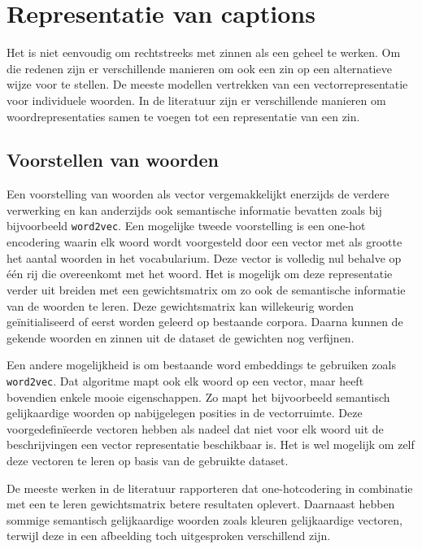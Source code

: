 \section{Representatie van captions}
Het is niet eenvoudig om rechtstreeks met zinnen als een geheel te werken. Om die redenen zijn er verschillende manieren om ook een zin op een alternatieve wijze voor te stellen.
De meeste modellen vertrekken van een vectorrepresentatie voor individuele woorden. In de literatuur zijn er verschillende manieren om woordrepresentaties samen te voegen tot een representatie van een zin.

\subsection{Voorstellen van woorden}
 Een voorstelling van woorden als vector vergemakkelijkt enerzijds de verdere verwerking en kan anderzijds ook semantische informatie bevatten zoals bij bijvoorbeeld \texttt{word2vec}.\cite{Mikolov2013} 
 Een mogelijke tweede voorstelling is een one-hot encodering waarin elk woord wordt voorgesteld door een vector met als grootte het aantal woorden in het vocabularium. Deze vector is volledig nul behalve op \'e\'en rij die overeenkomt met het woord. Het is mogelijk om deze representatie verder uit breiden met een gewichtsmatrix om zo ook de semantische informatie van de woorden te leren. Deze gewichtsmatrix kan willekeurig worden ge\"initialiseerd of eerst worden geleerd op bestaande corpora.\cite{Lebret2013,Google,Mao2014a} Daarna kunnen de gekende woorden en zinnen uit de dataset de gewichten nog verfijnen.  

 Een andere mogelijkheid is om bestaande word embeddings te gebruiken zoals \texttt{word2vec}. Dat algoritme mapt ook elk woord op een vector, maar heeft bovendien enkele mooie eigenschappen. Zo mapt het bijvoorbeeld semantisch gelijkaardige woorden op nabijgelegen posities in de vectorruimte.\cite{Mikolov2013} Deze voorgedefin\"ieerde vectoren hebben als nadeel dat niet voor elk woord uit de beschrijvingen een vector representatie beschikbaar is. Het is wel mogelijk om zelf deze vectoren te leren op basis van de gebruikte dataset.

 De meeste werken in de literatuur rapporteren dat one-hotcodering in combinatie met een te leren gewichtsmatrix betere resultaten oplevert. Daarnaast hebben sommige semantisch gelijkaardige woorden zoals kleuren gelijkaardige vectoren, terwijl deze in een afbeelding toch uitgesproken verschillend zijn.\cite{Karpathy2015}
 
